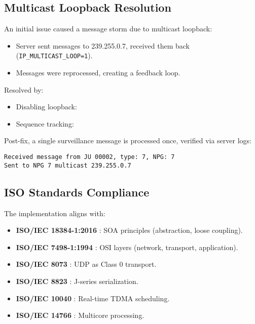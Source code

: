 \documentclass{article}
\begin{document}
\subsection{Multicast Loopback Resolution}
An initial issue caused a message storm due to multicast loopback:
\begin{itemize}
    \item Server sent messages to 239.255.0.7, received them back (\texttt{IP\_MULTICAST\_LOOP=1}).
    \item Messages were reprocessed, creating a feedback loop.
\end{itemize}
Resolved by:
\begin{itemize}
    \item Disabling loopback: %
    \item Sequence tracking: %
\end{itemize}
Post-fix, a single surveillance message is processed once, verified via server logs:
\begin{lstlisting}
Received message from JU 00002, type: 7, NPG: 7
Sent to NPG 7 multicast 239.255.0.7
\end{lstlisting}

\subsection{ISO Standards Compliance}
The implementation aligns with:
\begin{itemize}
    \item \textbf{ISO/IEC 18384-1:2016} \cite{iso18384}: SOA principles (abstraction, loose coupling).
    \item \textbf{ISO/IEC 7498-1:1994} \cite{iso7498}: OSI layers (network, transport, application).
    \item \textbf{ISO/IEC 8073} \cite{iso8073}: UDP as Class 0 transport.
    \item \textbf{ISO/IEC 8823} \cite{iso8823}: J-series serialization.
    \item \textbf{ISO/IEC 10040} \cite{iso10040}: Real-time TDMA scheduling.
    \item \textbf{ISO/IEC 14766} \cite{iso14766}: Multicore processing.
\end{itemize}
\end{document}
